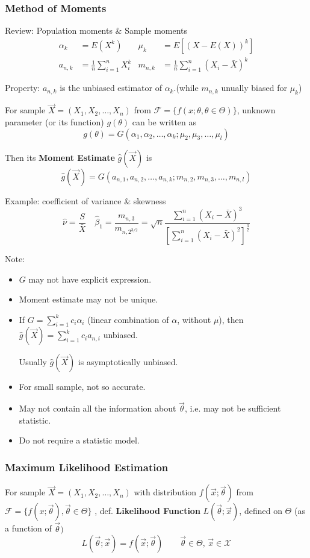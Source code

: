 \documentclass[11pt,a4paper]{ctexart}
\numberwithin{equation}{section}%
\begin{document}
\subsubsection{Method of Moments}\label{SubSectionMoM}
    Review: Population moments \& Sample moments
    \begin{align*}
        \alpha_k&=E(X^k)&\mu_k&=E[(X-E(X))^k]\\
        a_{n,k}&=\frac{1}{n}\sum_{i=1}^nX_i^k&m_{n,k}&=\frac{1}{n}\sum_{i=1}^n(X_i-\bar{X})^k
    \end{align*}

    Property: $a_{n,k}$ is the unbiased estimator of $\alpha_k$.(while $m_{n,k}$ unually biased for $\mu_k$)

    For sample $\vec{X}=(X_1,X_2,\ldots,X_n)$ from $\mathscr{F}=\{f(x;\theta,\theta\in\Theta)\}$, unknown parameter (or its function) $g(\theta)$ can be written as
    \[
        g(\theta)=G(\alpha_1,\alpha_2,\ldots,\alpha_k;\mu_2,\mu_3,\ldots,\mu_l)    
    \]

    Then its \textbf{Moment Estimate} $\hat{g}(\vec{X})$ is
\[
    \hat{g}(\vec{X})=G(a_{n,1},a_{n,2},\ldots,a_{n,k};m_{n,2},m_{n,3},\ldots,m_{n,l}) 
\]

    Example: coefficient of variance \& skewness 
    \[\hat{\nu}=\dfrac{S}{\bar{X}}\quad\hat{\beta}_1=\dfrac{m_{n,3}}{m_{n,2^{3/2}}}=\sqrt{n}{\displaystyle\frac{\displaystyle{\sum_{i=1}^n(X_i-\bar{X})^3}}{\displaystyle{[\sum_{i=1}^n(X_i-\bar{X})^2]^{\frac{3}{2}}}  }}\]

    Note:
    \begin{itemize}
        \item $G$ may not have explicit expression.
        \item Moment estimate may not be unique.
        \item If $G={\displaystyle\sum_{i=1}^kc_i\alpha_i}$ (linear combination of $\alpha$, without $\mu$), then $\hat{g}(\vec{X})={\displaystyle\sum_{i=1}^kc_ia_{n,i}}$ unbiased.
        
        \qquad Usually $\hat{g}(\vec{X})$ is asymptotically unbiased.
        \item For small sample, not so accurate.
        \item May not contain all the information about $\vec{\theta}$, i.e. may not be sufficient statistic.
        \item Do not require a statistic model.
    \end{itemize}


\subsubsection{Maximum Likelihood Estimation}\label{SubSectionMLE}
    For sample $\vec{X}=(X_1,X_2,\ldots,X_n)$ with distribution $f(\vec{x};\vec{\theta})$ from $\mathscr{F}=\{f(x;\vec{\theta}),\vec{\theta}\in\Theta\}$ , def. \textbf{Likelihood Function} $L(\vec{\theta};\vec{x})$, defined on $\Theta$ (as a function of $\vec{\theta})$
    \[
        L(\vec{\theta};\vec{x})=f(\vec{x};\vec{\theta})\qquad \vec{\theta}\in\Theta,\,\vec{x}\in\mathscr{X}    
    \]
\end{document}
